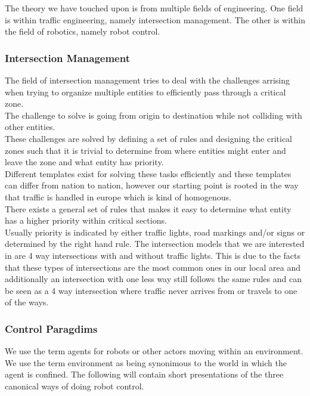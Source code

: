 The theory we have touched upon is from multiple fields of engineering. One field is within traffic engineering, namely intersection management. The other is within the field of robotics, namely robot control.

\subsubsection{Intersection Management}
The field of intersection management tries to deal with the challenges arrising when trying to organize multiple entities to efficiently pass through a critical zone.\\
The challenge to solve is going from origin to destination while not colliding with other entities.\\

These challenges are solved by defining a set of rules and designing the critical zones such that it is trivial to determine from where entities might enter and leave the zone and what entity has priority.\\
Different templates exist for solving these tasks efficiently and these templates can differ from nation to nation, however our starting point is rooted in the way that traffic is handled in europe which is kind of homogenous.\\
There exists a general set of rules that makes it easy to determine what entity has a higher priority within critical sections.\\
Usually priority is indicated by either traffic lights, road markings and/or signs or determined by the right hand rule.
The intersection models that we are interested in are 4 way intersections with and without traffic lights.
This is due to the facts that these types of intersections are the most common ones in our local area and additionally an intersection with one less way still follows the same rules and can be seen as a 4 way intersection where traffic never arrives from or travels to one of the ways.

\subsubsection{Control Paragdims}

We use the term agents for robots or other actors moving within an environment.\\
We use the term environment as being synonimous to the world in which the agent is confined.
The following will contain short presentations of the three canonical ways of doing robot control.

